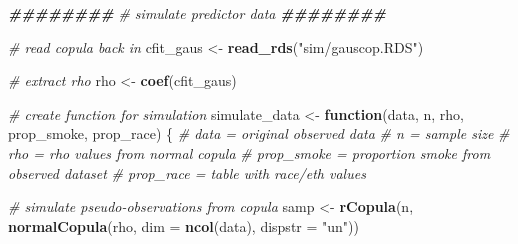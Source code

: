 \documentclass[12pt, twoside]{amherstthesis}
\newenvironment{Shaded}{\begin{snugshade}}{\end{snugshade}}
\newcommand{\AttributeTok}[1]{\textcolor[rgb]{0.13,0.29,0.53}{#1}}
\newcommand{\CommentTok}[1]{\textcolor[rgb]{0.56,0.35,0.01}{\textit{#1}}}
\newcommand{\ControlFlowTok}[1]{\textcolor[rgb]{0.13,0.29,0.53}{\textbf{#1}}}
\newcommand{\DocumentationTok}[1]{\textcolor[rgb]{0.56,0.35,0.01}{\textbf{\textit{#1}}}}
\newcommand{\FunctionTok}[1]{\textcolor[rgb]{0.13,0.29,0.53}{\textbf{#1}}}
\newcommand{\NormalTok}[1]{#1}
\newcommand{\OtherTok}[1]{\textcolor[rgb]{0.56,0.35,0.01}{#1}}
\newcommand{\StringTok}[1]{\textcolor[rgb]{0.31,0.60,0.02}{#1}}
\begin{document}
\begin{Shaded}
\begin{Highlighting}[]
\DocumentationTok{\#\#\#\#\#\#\#\#}
\CommentTok{\# simulate predictor data}
\DocumentationTok{\#\#\#\#\#\#\#\#}

\CommentTok{\# read copula back in }
\NormalTok{cfit\_gaus }\OtherTok{\textless{}{-}} \FunctionTok{read\_rds}\NormalTok{(}\StringTok{"sim/gauscop.RDS"}\NormalTok{)}

\CommentTok{\# extract rho }
\NormalTok{rho }\OtherTok{\textless{}{-}} \FunctionTok{coef}\NormalTok{(cfit\_gaus)}

\CommentTok{\# create function for simulation}
\NormalTok{simulate\_data }\OtherTok{\textless{}{-}} \ControlFlowTok{function}\NormalTok{(data, n, rho, prop\_smoke, prop\_race) \{}
  \CommentTok{\#\textquotesingle{} data = original observed data}
  \CommentTok{\#\textquotesingle{} n = sample size}
  \CommentTok{\#\textquotesingle{} rho = rho values from normal copula}
  \CommentTok{\#\textquotesingle{} prop\_smoke = proportion smoke from observed dataset}
  \CommentTok{\#\textquotesingle{} prop\_race = table with race/eth values}
  
  \CommentTok{\# simulate pseudo{-}observations from copula}
\NormalTok{  samp }\OtherTok{\textless{}{-}} \FunctionTok{rCopula}\NormalTok{(n, }\FunctionTok{normalCopula}\NormalTok{(rho, }\AttributeTok{dim =} \FunctionTok{ncol}\NormalTok{(data), }\AttributeTok{dispstr =} \StringTok{"un"}\NormalTok{))}
  

\end{Highlighting}
\end{Shaded}
\end{document}
